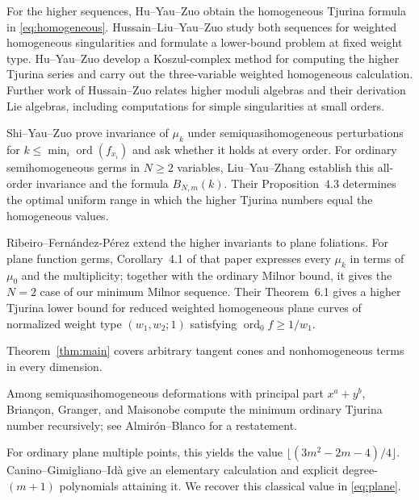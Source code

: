 \documentclass[12pt,reqno]{amsart}
\newcommand{\ord}{\operatorname{ord}}
\theoremstyle{definition}
\begin{document}
 For the higher sequences, Hu--Yau--Zuo
\cite[Corollary~4]{HYZHomogeneous} obtain the homogeneous Tjurina
formula in \eqref{eq:homogeneous}. Hussain--Liu--Yau--Zuo
\cite{HLYZ} study both sequences for weighted homogeneous
singularities and formulate a lower-bound problem at fixed weight
type. Hu--Yau--Zuo \cite{HYZ} develop a Koszul-complex method for
computing the higher Tjurina series and carry out the
three-variable weighted homogeneous calculation. Further work of
Hussain--Zuo \cite{HussainZuo2026} relates higher moduli algebras
and their derivation Lie algebras, including computations for simple
singularities at small orders.\par

  
Shi--Yau--Zuo \cite[Theorem~4.63 and Conjecture~4.65]{ShiYauZuo2024}
prove invariance of $\mu_k$ under semiquasihomogeneous perturbations for
$k\leq\min_i\ord(f_{x_i})$ and ask whether it holds at every order.
For ordinary semihomogeneous germs in $N\geq2$ variables,
Liu--Yau--Zhang \cite[Main Theorem~A and Proposition~4.1]{LiuYauZhang2026}
establish this all-order invariance and the formula $B_{N,m}(k)$.
Their Proposition~4.3 determines the optimal uniform range in which
the higher Tjurina numbers equal the homogeneous values.


 
Ribeiro--Fern\'andez-P\'erez \cite{FernandezPerezRibeiro} extend
the higher invariants to plane foliations. For plane function germs,
Corollary~4.1 of that paper expresses every $\mu_k$ in terms of
$\mu_0$ and the multiplicity; together with the ordinary Milnor bound,
it gives the $N=2$ case of our minimum Milnor sequence.
Their Theorem~6.1 gives a higher Tjurina lower bound for reduced
weighted homogeneous plane curves of normalized weight type
$(w_1,w_2;1)$ satisfying $\ord_0 f\geq1/w_1$.

Theorem~\ref{thm:main} covers arbitrary tangent cones and nonhomogeneous
terms in every dimension. 


Among semiquasihomogeneous deformations with principal part
$x^a+y^b$, Brian\c{c}on, Granger, and Maisonobe \cite{BGM}
compute the minimum ordinary Tjurina number recursively; see
Almir\'on--Blanco \cite[\S3, Theorem~2]{AlmironBlanco}
for a restatement.

For ordinary plane multiple points, this yields the value
$\lfloor(3m^2-2m-4)/4\rfloor$. Canino--Gimigliano--Id\`a
\cite[\S5 of the preprint version]{CaninoGimiglianoIda}
give an elementary calculation and explicit degree-$(m+1)$
polynomials attaining it. We recover this classical value in
\eqref{eq:plane}.
\end{document}
